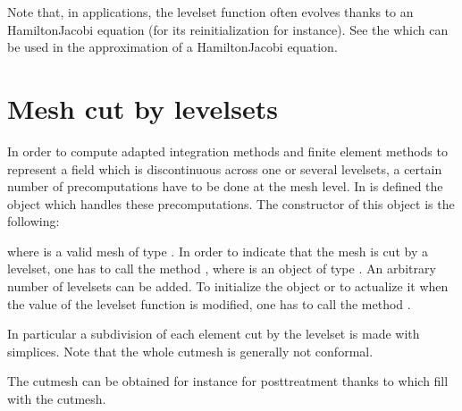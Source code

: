 \documentclass[a4paper,11pt,english]{sphinxmanual}
\begin{document}
Note that, in applications, the level\sphinxhyphen{}set function often evolves thanks
to an Hamilton\sphinxhyphen{}Jacobi equation (for its re\sphinxhyphen{}initialization for instance).
See the {\hyperref[\detokenize{userdoc/convect:ud-convect}]{}} which can be used in the approximation of a
Hamilton\sphinxhyphen{}Jacobi equation.


\section{Mesh cut by level\sphinxhyphen{}sets}
\label{\detokenize{userdoc/xfem:mesh-cut-by-level-sets}}
In order to compute adapted integration methods and finite element methods to
represent a field which is discontinuous across one or several level\sphinxhyphen{}sets,
a certain number of pre\sphinxhyphen{}computations have to be done at the mesh level. In
 is defined the object  which
handles these pre\sphinxhyphen{}computations. The constructor of this object is the
following:

\begin{sphinxVerbatim}[commandchars=\\\{\}]
 
\end{sphinxVerbatim}

where  is a valid mesh of type . In order to indicate that
the mesh is cut by a level\sphinxhyphen{}set, one has to call the method
, where  is an object of type .
An arbitrary number of level\sphinxhyphen{}sets can be added. To initialize the object
or to actualize it when the value of the level\sphinxhyphen{}set function is modified,
one has to call the method .

In particular a subdivision of each element cut by the level\sphinxhyphen{}set is made with
simplices. Note that the whole cut\sphinxhyphen{}mesh is generally not conformal.

The cut\sphinxhyphen{}mesh can be obtained for instance for post\sphinxhyphen{}treatment thanks to  which fill  with the cut\sphinxhyphen{}mesh.
\end{document}
